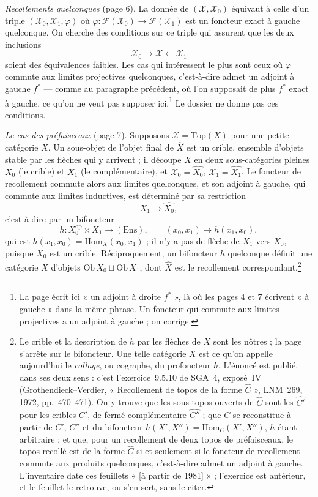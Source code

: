 \documentclass[11pt,a4paper]{article}
\begin{document}
\emph{Recollements quelconques} (page 6). La donnée de
$(\mathcal{X}, \mathcal{X}_{0})$ équivaut à celle d'un triple
$(\mathcal{X}_{0}, \mathcal{X}_{1}, \varphi)$ où
$\varphi : \mathcal{F}(\mathcal{X}_{0}) \to \mathcal{F}(\mathcal{X}_{1})$ est un
foncteur exact à gauche quelconque. On cherche des conditions sur ce triple qui
assurent que les deux inclusions
\[
\mathcal{X}_{0} \longrightarrow \mathcal{X} \longleftarrow \mathcal{X}_{1}
\]
soient des équivalences faibles. Les cas qui intéressent le plus sont ceux où
$\varphi$ commute aux limites projectives quelconques, c'est-à-dire admet un
adjoint à gauche $f^{*}$ --- comme au paragraphe précédent, où l'on supposait de
plus $f^{*}$ exact à gauche, ce qu'on ne veut pas supposer ici.\footnote{La page
écrit ici « un adjoint à droite $f^{*}$ », là où les pages 4 et 7 écrivent « à
gauche » dans la même phrase. Un foncteur qui commute aux limites projectives
a un adjoint à gauche ; on corrige.} Le dossier ne donne pas ces conditions.

\emph{Le cas des préfaisceaux} (page 7). Supposons $\mathcal{X} =
\mathrm{Top}(X)$ pour une petite catégorie $X$. Un sous-objet de l'objet final
de $\widehat{X}$ est un crible, ensemble d'objets stable par les flèches qui y
arrivent ; il découpe $X$ en deux sous-catégories pleines $X_{0}$ (le crible)
et $X_{1}$ (le complémentaire), et $\mathcal{X}_{0} = \widehat{X_{0}}$,
$\mathcal{X}_{1} = \widehat{X_{1}}$. Le foncteur de recollement commute alors
aux limites quelconques, et son adjoint à gauche, qui commute aux limites
inductives, est déterminé par sa restriction
\[
X_{1} \longrightarrow \widehat{X_{0}},
\]
c'est-à-dire par un bifoncteur
\[
h : X_{0}^{\mathrm{op}} \times X_{1} \longrightarrow (\mathrm{Ens}),
\qquad (x_{0}, x_{1}) \longmapsto h(x_{1}, x_{0}),
\]
qui est $h(x_{1}, x_{0}) = \mathrm{Hom}_{X}(x_{0}, x_{1})$ ; il n'y a pas de
flèche de $X_{1}$ vers $X_{0}$, puisque $X_{0}$ est un crible.
Réciproquement, un bifoncteur $h$ quelconque définit une catégorie $X$
d'objets $\mathrm{Ob}\, X_{0} \sqcup \mathrm{Ob}\, X_{1}$, dont $\widehat{X}$ est
le recollement correspondant.\footnote{Le crible et la description de $h$ par
les flèches de $X$ sont les nôtres ; la page s'arrête sur le bifoncteur. Une
telle catégorie $X$ est ce qu'on appelle aujourd'hui le \emph{collage}, ou
cographe, du profoncteur $h$. L'énoncé est publié, dans ses deux sens : c'est
l'exercice~9.5.10 de SGA~4, exposé~IV (Grothendieck--Verdier,
« Recollement de topos de la forme $\widehat{C}$ », LNM~269, 1972,
pp.~470--471). On y trouve que les sous-topos ouverts de $\widehat{C}$ sont
les $\widehat{C'}$ pour les cribles $C'$, de fermé complémentaire
$\widehat{C''}$ ; que $C$ se reconstitue à partir de $C'$, $C''$ et du
bifoncteur $h(X', X'') = \mathrm{Hom}_{C}(X', X'')$, $h$ étant arbitraire ;
et que, pour un recollement de deux topos de préfaisceaux, le topos recollé
est de la forme $\widehat{C}$ si et seulement si le foncteur de recollement
commute aux produits quelconques, c'est-à-dire admet un adjoint à gauche.
L'inventaire date ces feuillets « [à partir de 1981] » ; l'exercice est
antérieur, et le feuillet le retrouve, ou s'en sert, sans le citer.}
\end{document}
